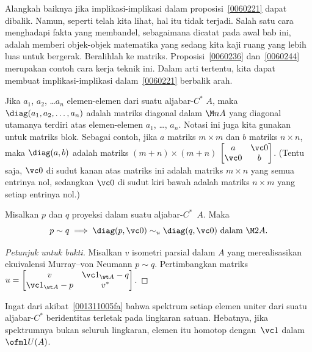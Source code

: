 Alangkah baiknya jika implikasi-implikasi dalam proposisi~\ref{0060221} dapat dibalik. Namun, seperti telah kita lihat, hal itu tidak terjadi.
Salah satu cara menghadapi fakta yang membandel, sebagaimana dicatat pada awal bab ini, adalah memberi objek-objek matematika
yang sedang kita kaji ruang yang lebih luas untuk bergerak. Beralihlah ke matriks. Proposisi~\ref{0060236} dan~\ref{0060244} merupakan contoh
cara kerja teknik ini. Dalam arti tertentu, kita dapat membuat implikasi-implikasi dalam~\ref{0060221} berbalik arah.

\begin{notn} Jika $a_1$, $a_2$, \dots $a_n$ elemen-elemen dari suatu aljabar-$C^*$ $A$, maka
$\diag(a_1,a_2,\dots,a_n)$ adalah matriks diagonal dalam $\M nA$ yang diagonal utamanya terdiri atas
elemen-elemen $a_1$, \dots, $a_n$. Notasi ini juga kita gunakan untuk matriks blok. Sebagai
contoh, jika $a$ matriks $m \times m$ dan $b$ matriks $n \times n$, maka
$\diag(a,b)$ adalah matriks $(m+n) \times (m+n)$ $\begin{bmatrix} a & \vc 0 \\ \vc 0 & b
\end{bmatrix}$. (Tentu saja, $\vc 0$ di sudut kanan atas matriks ini adalah matriks $m \times n$ yang semua
entrinya nol, sedangkan $\vc 0$ di sudut kiri bawah adalah matriks $n \times m$ yang setiap entrinya nol.)
\end{notn}

\begin{prop}\label{0060236} Misalkan $p$ dan $q$ proyeksi dalam suatu aljabar-$C^*$~$A$. Maka
   \[ p \sim q \implies \diag(p,\vc 0) \sim_u \diag(q,\vc 0) \text{ dalam $\M 2A$.} \]
\end{prop}

\begin{proof}[\emph{Petunjuk untuk bukti}] Misalkan $v$ isometri parsial dalam $A$ yang merealisasikan ekuivalensi Murray--von Neumann $p \sim q$.
Pertimbangkan matriks $u = \begin{bmatrix} v  &  \vc 1_{\wt A} - q  \\  \vc 1_{\wt A} - p  &  v^* \end{bmatrix}$.  \ns
\end{proof}

Ingat dari akibat~\ref{001311005fa} bahwa spektrum setiap elemen uniter dari suatu aljabar-$C^*$ beridentitas terletak pada lingkaran satuan.
Hebatnya, jika spektrumnya bukan seluruh lingkaran, elemen itu homotop dengan~$\vc 1$ dalam~$\ofml U(A)$.

